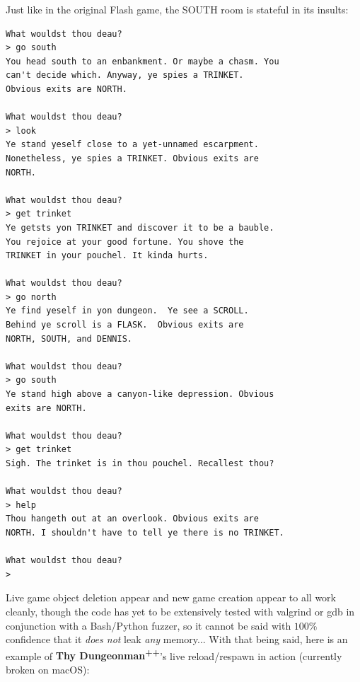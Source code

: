 \documentclass[man,12pt]{apa6}
\begin{document}
Just like in the original Flash game, the \textsf{SOUTH} room is stateful in its
insults:

\begin{singlespace}
\begin{framed}
\begin{verbatim}What wouldst thou deau?
> go south
You head south to an enbankment. Or maybe a chasm. You
can't decide which. Anyway, ye spies a TRINKET.
Obvious exits are NORTH.

What wouldst thou deau?
> look
Ye stand yeself close to a yet-unnamed escarpment.
Nonetheless, ye spies a TRINKET. Obvious exits are
NORTH.

What wouldst thou deau?
> get trinket
Ye getsts yon TRINKET and discover it to be a bauble.
You rejoice at your good fortune. You shove the
TRINKET in your pouchel. It kinda hurts.

What wouldst thou deau?
> go north
Ye find yeself in yon dungeon.  Ye see a SCROLL.
Behind ye scroll is a FLASK.  Obvious exits are
NORTH, SOUTH, and DENNIS.

What wouldst thou deau?
> go south
Ye stand high above a canyon-like depression. Obvious
exits are NORTH.

What wouldst thou deau?
> get trinket
Sigh. The trinket is in thou pouchel. Recallest thou?

What wouldst thou deau?
> help
Thou hangeth out at an overlook. Obvious exits are
NORTH. I shouldn't have to tell ye there is no TRINKET.

What wouldst thou deau?
>
\end{verbatim}
\end{framed}
\end{singlespace}

Live game object deletion appear and new game creation appear to all work
cleanly, though the code has yet to be extensively tested with \textsf{valgrind}
or \textsf{gdb} in conjunction with a Bash/Python fuzzer, so it cannot be said
with $100\%$ confidence that it \emph{does not} leak \emph{any} memory...
With that being said, here is an example of
\textbf{Thy Dungeonman\textsuperscript{++}}'s live reload/respawn in action
(currently broken on macOS):
\end{document}
